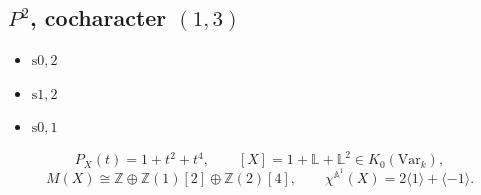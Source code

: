 \subsection*{$P^2$, cocharacter $(1, 3)$}
\begin{itemize}
  \item[0:] $\mathrm{s0,2}$
  \item[1:] $\mathrm{s1,2}$
  \item[2:] $\mathrm{s0,1}$
\end{itemize}
\[ P_X(t) = 1 + t^{2} + t^{4}, \qquad [X] = 1 + \mathbb{L} + \mathbb{L}^{2} \in K_0(\mathrm{Var}_k), \]
\[ M(X) \cong \mathbb{Z} \oplus \mathbb{Z}(1)[2] \oplus \mathbb{Z}(2)[4], \qquad \chi^{\mathbb{A}^1}(X) = 2\langle 1\rangle + \langle -1\rangle. \]

